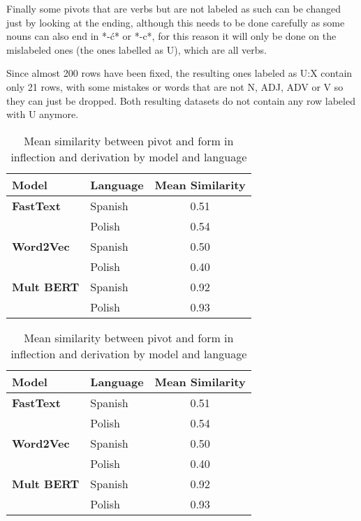\documentclass[12pt]{article}
\begin{document}
Finally some pivots that are verbs but are not labeled as such can be changed just by looking at the ending, although this needs to be done carefully as some nouns can also end in *-ć* or *-c*, for this reason it will only be done on the mislabeled ones (the ones labelled as U), which are all verbs.

Since almost 200 rows have been fixed, the resulting ones labeled as U:X contain only 21 rows, with some mistakes or words that are not N, ADJ, ADV or V so they can just be dropped. Both resulting datasets do not contain any row labeled with U anymore.

\begin{table}[ht]
\centering
\label{tbl:mean-similarity}
\begin{minipage}[t]{0.48\textwidth}
\small
\centering
{}
\begin{tabular}{llc}
\toprule
\textbf{Model} & \textbf{Language} & \textbf{Mean Similarity} \\
\midrule
\textbf{FastText}  & Spanish & 0.51 \\
                   & Polish  & 0.54 \\
\textbf{Word2Vec}  & Spanish & 0.50 \\
                   & Polish  & 0.40 \\
\textbf{Mult BERT} & Spanish & 0.92 \\
                   & Polish  & 0.93 \\
\bottomrule
\end{tabular}
\end{minipage}
\hfill
\begin{minipage}[t]{0.48\textwidth}
\small
\centering
{}
\begin{tabular}{llc}
\toprule
\textbf{Model} & \textbf{Language} & \textbf{Mean Similarity} \\
\midrule
\textbf{FastText}  & Spanish & 0.51 \\
                   & Polish  & 0.54 \\
\textbf{Word2Vec}  & Spanish & 0.50 \\
                   & Polish  & 0.40 \\
\textbf{Mult BERT} & Spanish & 0.92 \\
                   & Polish  & 0.93 \\
\bottomrule
\end{tabular}
\end{minipage}
\caption{Mean similarity between pivot and form in inflection and derivation by model and language}
\end{table}
\end{document}
